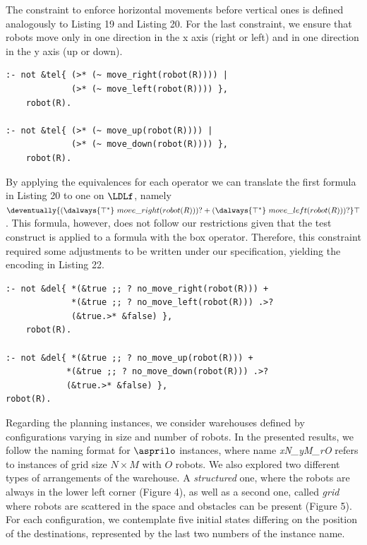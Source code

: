 The constraint to enforce horizontal movements before vertical ones is defined analogously to Listing 19 and Listing 20. For the last constraint, we ensure that robots move only in one direction in the x axis (right or left) and in one direction in the y axis (up or down). 

\begin{center}
    \begin{lstlisting}[] 
:- not &tel{ (>* (~ move_right(robot(R)))) |  
             (>* (~ move_left(robot(R)))) }, 
    robot(R).

:- not &tel{ (>* (~ move_up(robot(R)))) |  
             (>* (~ move_down(robot(R)))) }, 
    robot(R).
    \end{lstlisting}
\end{center}

By applying the equivalences for each operator we can translate the first formula in Listing 20 to one on $\LDLf$, namely $\deventually{(\dalways{\top^\ast}~move\_right(robot(R)))? + (\dalways{\top^\ast}~move\_left(robot(R)))?}\top$. This formula, however, does not follow our restrictions given that the test construct is applied to a formula with the box operator. Therefore, this constraint required some adjustments to be written under our specification, yielding the encoding in Listing 22.


\begin{center}
    \begin{lstlisting}[] 
:- not &del{ *(&true ;; ? no_move_right(robot(R))) +
             *(&true ;; ? no_move_left(robot(R))) .>?
             (&true.>* &false) }, 
    robot(R).

:- not &del{ *(&true ;; ? no_move_up(robot(R))) +
            *(&true ;; ? no_move_down(robot(R))) .>?
            (&true.>* &false) }, 
robot(R).
    \end{lstlisting}
\end{center}

Regarding the planning instances, we consider warehouses defined by configurations varying in size and number of robots. In the presented results, we follow the naming format for $\asprilo$ instances, where name \textit{xN\_yM\_rO} refers to instances of grid size $N\times M$ with $O$ robots.  
We also explored two different types of arrangements of the warehouse. A \emph{structured} one, where the robots are always in the lower left corner (Figure 4), as well as a second one, called \emph{grid} where robots are scattered in the space and obstacles can be present (Figure 5). 
For each configuration, we contemplate five initial states differing on the position of the destinations, represented by the last two numbers of the instance name.


